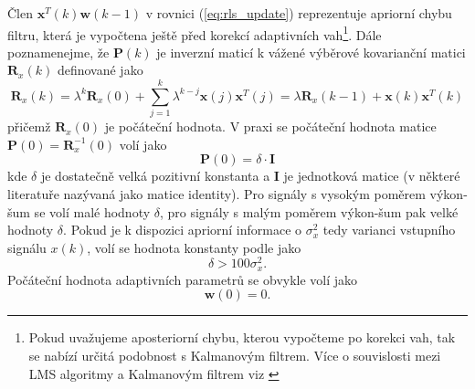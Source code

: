 Člen $\textbf{x}^T(k)\textbf{w}(k-1)$ v rovnici (\ref{eq:rls_update}) reprezentuje apriorní chybu filtru, která je vypočtena ještě před korekcí adaptivních vah\footnote{Pokud uvažujeme aposteriorní chybu, kterou vypočteme po korekci vah, tak se nabízí určitá podobnost s Kalmanovým filtrem. Více o souvislosti mezi LMS algoritmy a Kalmanovým filtrem viz \cite{rls_kalman}}. 
Dále poznamenejme, že $\textbf{P}(k)$ je inverzní maticí k vážené výběrové kovarianční matici $\textbf{R}_x(k)$ definované jako
\begin{equation}
    \textbf{R}_{x}(k)=\lambda^k\textbf{R}_x(0)+ \sum_{j=1}^k \lambda^{k-j}\textbf{x}(j)\textbf{x}^T(j)=\lambda \textbf{R}_{x}(k-1)+\textbf{x}(k)\textbf{x}^T(k)
\end{equation}
přičemž $\textbf{R}_x(0)$ je počáteční hodnota. V praxi se počáteční hodnota matice $\textbf{P}(0)=\textbf{R}_x^{-1}(0)$ volí jako
\begin{equation}
    \textbf{P}(0)=\delta \cdot \textbf{I}
\end{equation}
kde $\delta$ je dostatečně velká pozitivní konstanta a $\textbf{I}$ je jednotková matice (v některé literatuře nazývaná jako matice identity). Pro signály s vysokým poměrem výkon-šum se volí malé hodnoty $\delta$, pro signály s malým poměrem výkon-šum pak velké hodnoty $\delta$. Pokud je k dispozici apriorní informace o $\sigma_x^2$ tedy varianci vstupního signálu $x(k)$, volí se hodnota konstanty podle \cite{rls_mit} jako
\begin{equation}
    \delta>100\sigma_x^2.
\end{equation}
Počáteční hodnota adaptivních parametrů se obvykle volí jako
\begin{equation}
    \textbf{w}(0)= 0.
\end{equation}

